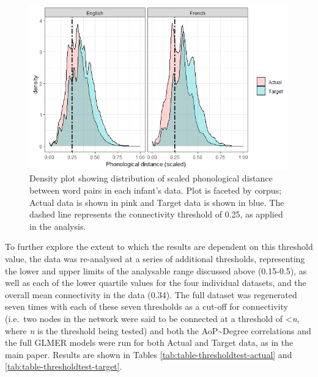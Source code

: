 \documentclass[
  man,floatsintext]{apa6}
\begin{document}
\begin{figure}
\centering
\includegraphics{Images/distance-density-plot.png}
\caption{\label{fig:dist-density-plot}Density plot showing distribution of scaled phonological distance between word pairs in each infant's data. Plot is faceted by corpus; Actual data is shown in pink and Target data is shown in blue. The dashed line represents the connectivity threshold of 0.25, as applied in the analysis.}
\end{figure}

To further explore the extent to which the results are dependent on this threshold value, the data was re-analysed at a series of additional thresholds, representing the lower and upper limits of the analysable range discussed above (0.15-0.5), as well as each of the lower quartile values for the four individual datasets, and the overall mean connectivity in the data (0.34). The full dataset was regenerated seven times with each of these seven thresholds as a cut-off for connectivity (i.e.~two nodes in the network were said to be connected at a threshold of \textless{}\emph{n}, where \emph{n} is the threshold being tested) and both the AoP\textasciitilde Degree correlations and the full GLMER models were run for both Actual and Target data, as in the main paper. Results are shown in Tables \ref{tab:table-thresholdtest-actual} and \ref{tab:table-thresholdtest-target}.

\newpage

\begingroup\fontsize{8}{10}\selectfont
\end{document}
